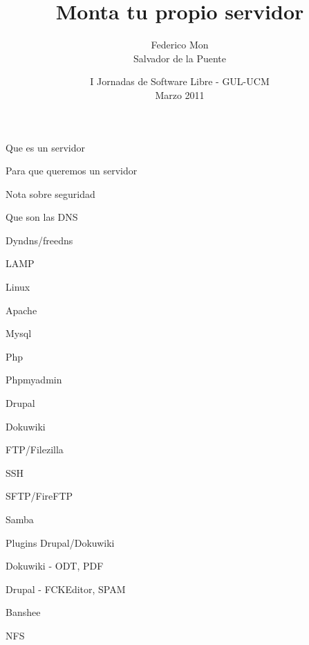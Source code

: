 \documentclass[spanish]{beamer}
\title[Monta tu propio servidor - GUL-UCM]
{Monta tu propio servidor
}
\author[\url{http://gulucm.org}]
{
Federico Mon\\
Salvador de la Puente
}
\institute{Facultad de Informática.\\Universidad Complutense de Madrid.}
\date{
I Jornadas de Software Libre - GUL-UCM\\
Marzo 2011}
\begin{document}
    \frame{\titlepage}
\begin{frame}{Que es un servidor}
\end{frame}
\begin{frame}{Para que queremos un servidor}
\end{frame}
\begin{frame}{Nota sobre seguridad}
\end{frame}
\begin{frame}{Que son las DNS}
\end{frame}
\begin{frame}{Dyndns/freedns}
\end{frame}
\begin{frame}{LAMP}
\end{frame}
\begin{frame}{Linux}
\end{frame}
\begin{frame}{Apache}
\end{frame}
\begin{frame}{Mysql}
\end{frame}
\begin{frame}{Php}
\end{frame}
\begin{frame}{Phpmyadmin}
\end{frame}
\begin{frame}{Drupal}
\end{frame}
\begin{frame}{Dokuwiki}
\end{frame}
\begin{frame}{FTP/Filezilla}
\end{frame}
\begin{frame}{SSH}
\end{frame}
\begin{frame}{SFTP/FireFTP}
\end{frame}
\begin{frame}{Samba}
\end{frame}
\begin{frame}{Plugins Drupal/Dokuwiki}
\end{frame}
\begin{frame}{Dokuwiki - ODT, PDF}
\end{frame}
\begin{frame}{Drupal - FCKEditor, SPAM}
\end{frame}
\begin{frame}{Banshee}
\end{frame}
\begin{frame}{NFS}
\end{frame}
\end{document}
